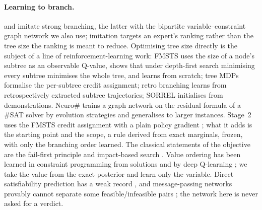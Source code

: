 \documentclass[final,5p,times,twocolumn,authoryear]{elsarticle}
\begin{document}
\paragraph{Learning to branch.} \citet{khalil2016learning} and \citet{gasse2019exact} imitate strong branching, the latter with the bipartite variable--constraint graph network we also use; imitation targets an expert's ranking rather than the tree size the ranking is meant to reduce. Optimising tree size directly is the subject of a line of reinforcement-learning work: FMSTS \citep{etheve2020reinforcement} uses the size of a node's subtree as an observable Q-value, shows that under depth-first search minimising every subtree minimises the whole tree, and learns from scratch; tree MDPs \citep{scavuzzo2022learning} formalise the per-subtree credit assignment; retro branching \citep{parsonson2023reinforcement} learns from retrospectively extracted subtree trajectories; SORREL \citep{sorrel2025} initialises from demonstrations. Neuro\# \citep{vaezipoor2021learning} trains a graph network on the residual formula of a \#SAT solver by evolution strategies and generalises to larger instances. Stage~2 uses the FMSTS credit assignment with a plain policy gradient \citep{williams1992simple}; what it adds is the starting point and the scope, a rule derived from exact marginals, frozen, with only the branching order learned. The classical statements of the objective are the fail-first principle \citep{haralick1980increasing} and impact-based search \citep{refalo2004impact}. Value ordering has been learned in constraint programming from solutions \citep{chu2015learning} and by deep Q-learning \citep{cappart2021combining}; we take the value from the exact posterior and learn only the variable. Direct satisfiability prediction has a weak record \citep{selsam2019neurosat,li2023g4satbench}, and message-passing networks provably cannot separate some feasible/infeasible pairs \citep{chen2023representing}; the network here is never asked for a verdict.
\end{document}
